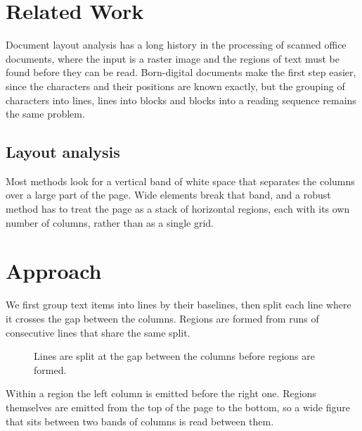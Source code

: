 \documentclass[10pt,twocolumn]{article}
\begin{document}
\newpage
\section{Related Work}

Document layout analysis has a long history in the processing of scanned
office documents, where the input is a raster image and the regions of text
must be found before they can be read. Born-digital documents make the first
step easier, since the characters and their positions are known exactly, but
the grouping of characters into lines, lines into blocks and blocks into a
reading sequence remains the same problem.

\subsection{Layout analysis}

Most methods look for a vertical band of white space that separates the
columns over a large part of the page. Wide elements break that band, and a
robust method has to treat the page as a stack of horizontal regions, each
with its own number of columns, rather than as a single grid.

\newpage
\section{Approach}

We first group text items into lines by their baselines, then split each
line where it crosses the gap between the columns. Regions are formed from
runs of consecutive lines that share the same split.

\begin{figure}[H]
  \centering
  \caption{Lines are split at the gap between the columns before regions
  are formed.}
  \label{fig:split}
\end{figure}

Within a region the left column is emitted before the right one. Regions
themselves are emitted from the top of the page to the bottom, so a wide
figure that sits between two bands of columns is read between them.
\end{document}
